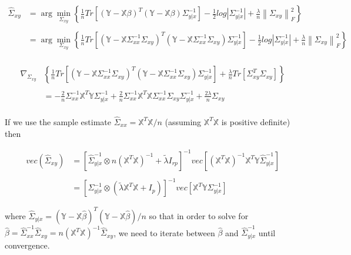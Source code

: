 \documentclass[11pt,]{book}
\theoremstyle{definition}
\theoremstyle{definition}
\theoremstyle{definition}
\theoremstyle{remark}
\begin{document}
\begin{align*}
  \hat{\Sigma}_{xy} &= \arg\min_{\Sigma_{xy}}\left\{ \frac{1}{n} Tr\left[ \left(\mathbb{Y} - \mathbb{X}\beta \right)^{T}\left( \mathbb{Y} - \mathbb{X}\beta \right)\Sigma_{y | x}^{-1} \right] - \frac{1}{2}log\left| \Sigma_{y | x}^{-1} \right| + \frac{\lambda}{n}\left\| \Sigma_{xy} \right\|_{F}^{2} \right\} \\
  & \\
  &= \arg\min_{\Sigma_{xy}}\left\{ \frac{1}{n} Tr\left[ \left(\mathbb{Y} - \mathbb{X}\Sigma_{xx}^{-1}\Sigma_{xy} \right)^{T}\left( \mathbb{Y} - \mathbb{X}\Sigma_{xx}^{-1}\Sigma_{xy} \right)\Sigma_{y | x}^{-1} \right] - \frac{1}{2}log\left| \Sigma_{y | x}^{-1} \right| + \frac{\lambda}{n}\left\| \Sigma_{xy} \right\|_{F}^{2} \right\} \\
\end{align*}

\begin{align*}
  \nabla_{\Sigma_{xy}}&\left\{ \frac{1}{n}Tr\left[ \left(\mathbb{Y} - \mathbb{X}\Sigma_{xx}^{-1}\Sigma_{xy} \right)^{T}\left(\mathbb{Y} - \mathbb{X}\Sigma_{xx}^{-1}\Sigma_{xy} \right)\Sigma_{y | x}^{-1} \right] + \frac{\lambda}{n}Tr\left[ \Sigma_{xy}^{T}\Sigma_{xy} \right] \right\} \\
  & \\
  &= -\frac{2}{n}\Sigma_{xx}^{-1}\mathbb{X}^{T}\mathbb{Y}\Sigma_{y | x}^{-1} + \frac{2}{n}\Sigma_{xx}^{-1}\mathbb{X}^{T}\mathbb{X}\Sigma_{xx}^{-1}\Sigma_{xy}\Sigma_{y | x}^{-1} + \frac{2\lambda}{n}\Sigma_{xy} \\
\end{align*}

If we use the sample estimate
\(\hat{\Sigma}_{xx} = \mathbb{X}^{T}\mathbb{X}/n\) (assuming
\(\mathbb{X}^{T}\mathbb{X}\) is positive definite) then

\begin{align*}
  vec\left( \hat{\Sigma}_{xy} \right) &= \left[\hat{\Sigma}_{y | x}^{-1} \otimes n\left( \mathbb{X}^{T}\mathbb{X} \right)^{-1} + \tilde{\lambda} I_{rp} \right]^{-1}vec\left[ \left( \mathbb{X}^{T}\mathbb{X} \right)^{-1}\mathbb{X}^{T}\mathbb{Y}\hat{\Sigma}_{y | x}^{-1} \right] \\
  & \\
  &= \left[ \Sigma_{y | x}^{-1} \otimes \left( \tilde{\lambda}\mathbb{X}^{T}\mathbb{X} + I_{p} \right) \right]^{-1}vec\left[ \mathbb{X}^{T}\mathbb{Y}\Sigma_{y | x}^{-1} \right]
\end{align*}

where
\(\hat{\Sigma}_{y | x} = (\mathbb{Y} - \mathbb{X}\hat{\beta} )^{T}(\mathbb{Y} - \mathbb{X}\hat{\beta})/n\)
so that in order to solve for
\(\hat{\beta} = \hat{\Sigma}_{xx}^{-1}\hat{\Sigma}_{xy} = n\left( \mathbb{X}^{T}\mathbb{X} \right)^{-1}\hat{\Sigma}_{xy}\),
we need to iterate between \(\hat{\beta}\) and
\(\hat{\Sigma}_{y | x}^{-1}\) until convergence.
\end{document}
